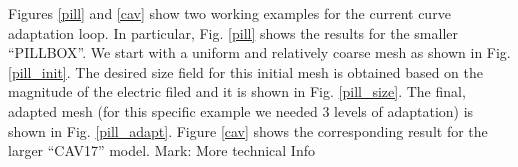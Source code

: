 \documentclass[review,12pt]{elsarticle_summary_report}
\begin{document}
Figures \ref{pill} and \ref{cav} show two working examples for the current curve adaptation loop.
In particular, Fig. \ref{pill} shows the results for the smaller ``PILLBOX''. We start with a uniform and relatively coarse mesh as shown in Fig. \ref{pill_init}. The desired size field for this initial mesh is obtained based on the magnitude of the electric filed and it is shown in Fig. \ref{pill_size}. The final, adapted mesh (for this specific example we needed 3 levels of adaptation) is shown in Fig. \ref{pill_adapt}. Figure \ref{cav} shows the corresponding result for the larger ``CAV17'' model. \color{blue} Mark: More technical Info \color{black}
\begin{landscape}
\begin{figure}[ph!]
\centering
{}
\hspace*{50pt}
\\

\end{figure}
\end{landscape}
\end{document}
